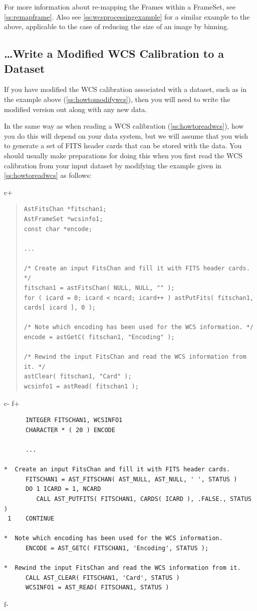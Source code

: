 \documentclass[twoside,11pt]{article}
\newcommand{\secref}[1]{\S\ref{#1}}
\renewcommand{\secref}[1]{\ref{#1}}
\begin{document}
For more information about re-mapping the Frames within a FrameSet,
see \secref{ss:remapframe}. Also see \secref{ss:wcsprocessingexample}
for a similar example to the above, applicable to the case of reducing
the size of an image by binning.

\subsection{\ldots Write a Modified WCS Calibration to a Dataset}

If you have modified the WCS calibration associated with a dataset,
such as in the example above (\secref{ss:howtomodifywcs}), then you
will need to write the modified version out along with any new data.

In the same way as when reading a WCS calibration
(\secref{ss:howtoreadwcs}), how you do this will depend on your data
system, but we will assume that you wish to generate a set of FITS
header cards that can be stored with the data. You should usually make
preparations for doing this when you first read the WCS calibration
from your input dataset by modifying the example given in
\secref{ss:howtoreadwcs} as follows:

c+
\begin{quote}
\small
\begin{verbatim}
AstFitsChan *fitschan1;
AstFrameSet *wcsinfo1;
const char *encode;

...

/* Create an input FitsChan and fill it with FITS header cards. */
fitschan1 = astFitsChan( NULL, NULL, "" );
for ( icard = 0; icard < ncard; icard++ ) astPutFits( fitschan1, cards[ icard ], 0 );

/* Note which encoding has been used for the WCS information. */
encode = astGetC( fitschan1, "Encoding" );

/* Rewind the input FitsChan and read the WCS information from it. */
astClear( fitschan1, "Card" );
wcsinfo1 = astRead( fitschan1 );
\end{verbatim}
\normalsize
\end{quote}
c-
f+
\small
\begin{verbatim}
      INTEGER FITSCHAN1, WCSINFO1
      CHARACTER * ( 20 ) ENCODE

      ...

*  Create an input FitsChan and fill it with FITS header cards.
      FITSCHAN1 = AST_FITSCHAN( AST_NULL, AST_NULL, ' ', STATUS )
      DO 1 ICARD = 1, NCARD
         CALL AST_PUTFITS( FITSCHAN1, CARDS( ICARD ), .FALSE., STATUS )
 1    CONTINUE

*  Note which encoding has been used for the WCS information.
      ENCODE = AST_GETC( FITSCHAN1, 'Encoding', STATUS );

*  Rewind the input FitsChan and read the WCS information from it.
      CALL AST_CLEAR( FITSCHAN1, 'Card', STATUS )
      WCSINFO1 = AST_READ( FITSCHAN1, STATUS )
\end{verbatim}
\normalsize
f-
\end{document}
